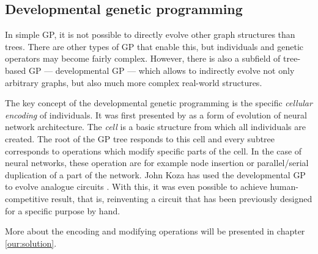 \subsection{Developmental genetic programming}
In simple GP, it is not possible to directly evolve other graph structures
than trees. There are other types of GP that enable this, but individuals
and genetic operators may become fairly complex. However, there is also a
subfield of tree-based GP --- developmental GP --- which allows to indirectly
evolve not only arbitrary graphs, but also much more complex real-world
structures.

The key concept of the developmental genetic programming is the
specific \emph{cellular encoding} of individuals. It was first presented by
\cite{Gruau:1994:thesis} as a form of evolution of neural network architecture.
The \emph{cell} is a basic structure from which all individuals are created.
The root of the GP tree responds to this cell and every subtree corresponds
to operations which modify specific parts of the cell. In the case of neural
networks, these operation are for example node insertion or parallel/serial
duplication of a part of the network. John Koza has used the developmental GP
to evolve analogue circuits \citep{Koza:1998:circuits}. With this, it was even
possible to achieve human-competitive result, that is, reinventing a circuit
that has been previously designed for a specific purpose by hand.

More about the encoding and modifying operations will be presented in
chapter \ref{our:solution}.